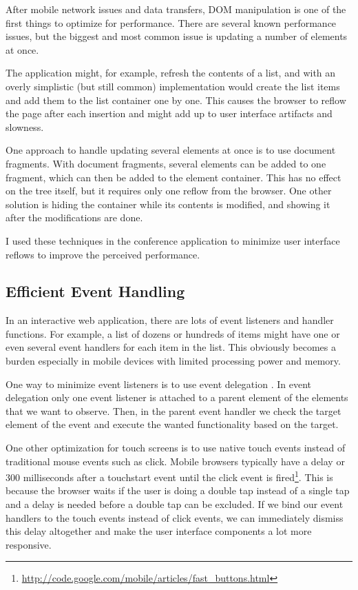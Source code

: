 After mobile network issues and data transfers, DOM manipulation is
one of the first things to optimize for performance. There are several
known performance issues, but the biggest and most common issue is
updating a number of elements at once. \cite{zakas2010high}

The application might, for example, refresh the contents of a list,
and with an overly simplistic (but still common) implementation would
create the list items and add them to the list container one by
one. This causes the browser to reflow the page after each insertion
and might add up to user interface artifacts and
slowness. \cite{zakas2010high}

One approach to handle updating several elements at once is to use
document fragments. With document fragments, several elements can be
added to one fragment, which can then be added to the element
container. This has no effect on the  tree itself, but it
requires only one reflow from the browser. One other solution is
hiding the container while its contents is modified, and showing it
after the modifications are done. \cite{zakas2010high}

I used these techniques in the conference application to minimize user
interface reflows to improve the perceived performance.

\subsection{Efficient Event Handling}

In an interactive web application, there are lots of event listeners
and handler functions. For example, a list of dozens or hundreds of
items might have one or even several event handlers for each item in
the list. This obviously becomes a burden especially in mobile devices
with limited processing power and memory.

One way to minimize event listeners is to use event delegation
\cite{zakas2010high}. In event delegation only one event listener is
attached to a parent element of the elements that we want to
observe. Then, in the parent event handler we check the target element
of the event and execute the wanted functionality based on the target.

One other optimization for touch screens is to use native touch events
instead of traditional mouse events such as click. Mobile browsers
typically have a delay or 300 milliseconds after a touchstart event
until the click event is
fired\footnote{\url{http://code.google.com/mobile/articles/fast_buttons.html}}. This
is because the browser waits if the user is doing a double tap instead
of a single tap and a delay is needed before a double tap can be
excluded. If we bind our event handlers to the touch events instead of
click events, we can immediately dismiss this delay altogether and
make the user interface components a lot more responsive.

